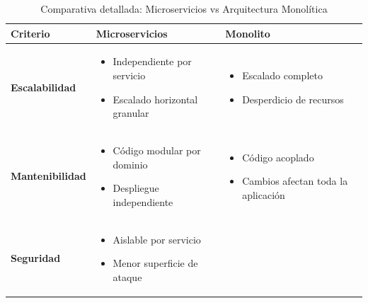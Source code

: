 \begin{table}[h]
\centering
\caption{Comparativa detallada: Microservicios vs Arquitectura Monolítica}
\label{tab:comparativa-arquitectura}
\begin{tabular}{|p{3cm}|p{4.5cm}|p{4.5cm}|}
\hline
\textbf{Criterio} & \textbf{Microservicios} & \textbf{Monolito} \\
\hline
\textbf{Escalabilidad} & 
\begin{minipage}[t]{4.5cm}
\begin{itemize}
    \item Independiente por servicio
    \item Escalado horizontal granular
\end{itemize}
\end{minipage} & 
\begin{minipage}[t]{4.5cm}
\begin{itemize}
    \item Escalado completo
    \item Desperdicio de recursos
\end{itemize}
\end{minipage} \\
\hline
\textbf{Mantenibilidad} & 
\begin{minipage}[t]{4.5cm}
\begin{itemize}
    \item Código modular por dominio
    \item Despliegue independiente
\end{itemize}
\end{minipage} & 
\begin{minipage}[t]{4.5cm}
\begin{itemize}
    \item Código acoplado
    \item Cambios afectan toda la aplicación
\end{itemize}
\end{minipage} \\
\hline
\textbf{Seguridad} & 
\begin{minipage}[t]{4.5cm}
\begin{itemize}
    \item Aislable por servicio
    \item Menor superficie de ataque
\end{itemize}
\end{minipage} & 
\begin{minipage}[t]{4.5cm}
\begin{itemize}

\end{itemize}
\end{minipage}
\end{tabular}
\end{table}
